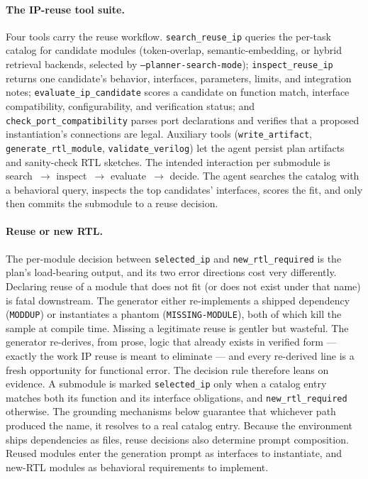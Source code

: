 \paragraph{The IP-reuse tool suite.}
Four tools carry the reuse workflow. \texttt{search\_reuse\_ip} queries
the per-task catalog for candidate modules (token-overlap,
semantic-embedding, or hybrid retrieval backends, selected by
\texttt{--planner-search-mode}); \texttt{inspect\_reuse\_ip} returns one
candidate's behavior, interfaces, parameters, limits, and integration
notes; \texttt{evaluate\_ip\_candidate} scores a candidate on function
match, interface compatibility, configurability, and verification
status; and \texttt{check\_port\_compatibility} parses port declarations
and verifies that a proposed instantiation's connections are legal.
Auxiliary tools (\texttt{write\_artifact}, \texttt{generate\_rtl\_module},
\texttt{validate\_verilog}) let the agent persist plan artifacts and
sanity-check RTL sketches. The intended interaction per submodule is
search~$\to$ inspect~$\to$ evaluate~$\to$ decide. The agent searches the
catalog with a behavioral query, inspects the top candidates' interfaces,
scores the fit, and only then commits the submodule to a reuse decision.

\paragraph{Reuse or new RTL.}
The per-module decision between \texttt{selected\_ip} and
\texttt{new\_rtl\_\allowbreak required} is the plan's load-bearing output, and its
two error directions cost very differently. Declaring reuse of a module
that does not fit (or does not exist under that name) is fatal
downstream. The generator either re-implements a shipped dependency
(\texttt{MODDUP}) or instantiates a phantom (\texttt{MISSING-MODULE}),
both of which kill the sample at compile time. Missing a legitimate
reuse is gentler but wasteful. The generator re-derives, from prose,
logic that already exists in verified form --- exactly the work IP reuse
is meant to eliminate --- and every re-derived line is a fresh
opportunity for functional error. The decision rule therefore leans on
evidence. A submodule is marked \texttt{selected\_ip} only when a
catalog entry matches both its function and its interface obligations,
and \texttt{new\_rtl\_required} otherwise. The grounding mechanisms
below guarantee that whichever path produced the name, it resolves to
a real catalog entry. Because the environment ships dependencies as
files, reuse decisions also determine prompt composition. Reused
modules enter the generation prompt as interfaces to instantiate,
and new-RTL modules as behavioral requirements to implement.

